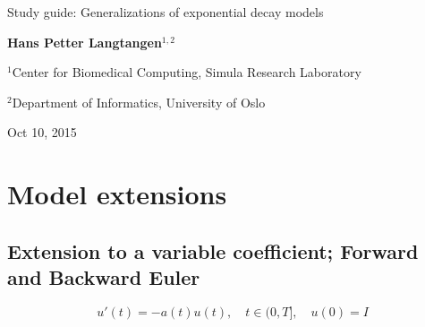 \documentclass[%
oneside,                 %
final,                   %
10pt]{article}
\begin{document}







\thispagestyle{empty}

\begin{center}
{\LARGE\bf
\begin{spacing}{1.25}
Study guide: Generalizations of exponential decay models
\end{spacing}
}
\end{center}


\begin{center}
{\bf Hans Petter Langtangen${}^{1, 2}$} \\ [0mm]
\end{center}

\begin{center}
\centerline{{\small ${}^1$Center for Biomedical Computing, Simula Research Laboratory}}
\centerline{{\small ${}^2$Department of Informatics, University of Oslo}}
\end{center}
    

\begin{center}
Oct 10, 2015
\end{center}

\vspace{1cm}


\section*{Model extensions}
\label{decay:generalizations}

\subsection*{Extension to a variable coefficient; Forward and Backward Euler}

\begin{equation}
u'(t) = -a(t)u(t),\quad t\in (0,T],\quad u(0)=I
\label{decay:problem:a}
\end{equation}
\end{document}

